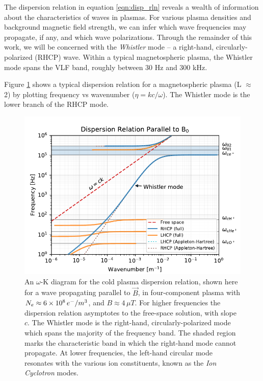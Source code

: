 
The dispersion relation in equation \ref{eqn:disp_rln} reveals a wealth of information about the characteristics of waves in plasmas. For various plasma densities and background magnetic field strength, we can infer which wave frequencies may propagate, if any, and which wave polarizations. Through the remainder of this work, we will be concerned with the \emph{Whistler} mode -- a right-hand, circularly-polarized (RHCP) wave. Within a typical magnetospheric plasma, the Whistler mode spans the VLF band, roughly between 30 Hz and 300 kHz.

Figure \ref{fig:whistler_mode_dispersion} shows a typical dispersion relation for a magnetospheric plasma (L $\approx$ 2) by plotting frequency vs wavenumber ($\eta = k c/\omega$). The Whistler mode is the lower branch of the RHCP mode.
\begin{figure}[!ht]
\begin{center}
\includegraphics{figures/omega-k_diagram_parallel}
\caption[An $\omega$-K diagram for the cold, four-component dispersion relation, for parallel propagation at L$\approx$3]{An $\omega$-K diagram for the cold plasma dispersion relation, shown here for a wave propagating parallel to $\vec{B}$, in four-component plasma with $N_e \approx  6\times 10^{8}\,e^-/m^3$, and $B\approx 4\,\mu T$. For higher frequencies the dispersion relation asymptotes to the free-space solution, with slope $c$. The Whistler mode is the right-hand, circularly-polarized mode which spans the majority of the frequency band. The shaded region marks the characteristic band in which the right-hand mode cannot propagate. At lower frequencies, the left-hand circular mode resonates with the various ion constituents,  known as the \emph{Ion Cyclotron} modes.}
\label{fig:whistler_mode_dispersion}
\end{center}
\end{figure}